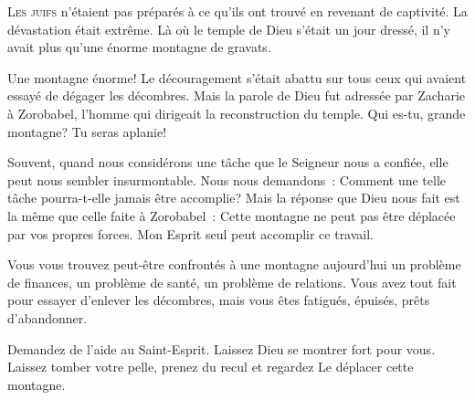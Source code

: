 
\lettrine{L}{es juifs} n'étaient pas préparés à ce qu'ils ont trouvé
 en revenant de captivité. La dévastation était extrême.
 Là où le temple de Dieu s'était un jour dressé,
 il n'y avait plus qu'une énorme montagne de gravats. 

Une montagne énorme! Le découragement s'était abattu sur tous ceux
 qui avaient essayé de dégager les décombres. Mais la parole de Dieu
 fut adressée par Zacharie à Zorobabel, l'homme qui dirigeait
 la reconstruction du temple.
 \Og Qui es-tu, grande montagne? Tu seras aplanie! \Fg{}

Souvent, quand nous considérons une tâche que le Seigneur nous a confiée,
 elle peut nous sembler insurmontable. Nous nous demandons~: 
 \Og Comment une telle tâche pourra-t-elle jamais être accomplie? \Fg{}
 Mais la réponse que Dieu nous fait est la même que celle faite à Zorobabel~:
 \Og Cette montagne ne peut pas être déplacée par vos propres forces.
 Mon Esprit seul peut accomplir ce travail. \Fg{}

Vous vous trouvez peut-être confrontés à une montagne aujourd'hui
 \ocadr un problème de finances, un problème de santé,
 un problème de relations. Vous avez tout fait pour essayer
 d'enlever les décombres, mais vous êtes fatigués, épuisés, prêts d'abandonner. 


Demandez de l'aide au Saint-Esprit. Laissez Dieu se montrer fort pour vous.
 Laissez tomber votre pelle, prenez du recul et regardez
 Le déplacer cette montagne. 

\dvrule




